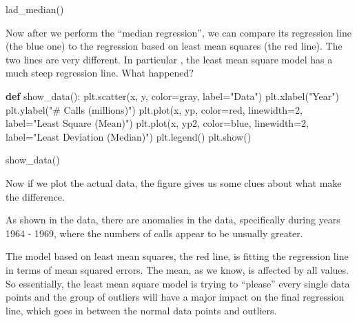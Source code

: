 \documentclass[
  letterpaper,
]{scrbook}
\newenvironment{Shaded}{\begin{snugshade}}{\end{snugshade}}
\newcommand{\DecValTok}[1]{\textcolor[rgb]{0.68,0.00,0.00}{#1}}
\newcommand{\KeywordTok}[1]{\textcolor[rgb]{0.00,0.23,0.31}{\textbf{#1}}}
\newcommand{\NormalTok}[1]{\textcolor[rgb]{0.00,0.23,0.31}{#1}}
\newcommand{\OperatorTok}[1]{\textcolor[rgb]{0.37,0.37,0.37}{#1}}
\newcommand{\StringTok}[1]{\textcolor[rgb]{0.13,0.47,0.30}{#1}}
\begin{document}
\begin{Shaded}
\begin{Highlighting}[]
\NormalTok{lad\_median()}
\end{Highlighting}
\end{Shaded}

Now after we perform the ``median regression'', we can compare its
regression line (the blue one) to the regression based on least mean
squares (the red line). The two lines are very different. In particular
, the least mean square model has a much steep regression line. What
happened?

\begin{Shaded}
\begin{Highlighting}[]
\KeywordTok{def}\NormalTok{ show\_data():}
\NormalTok{    plt.scatter(x, y,  color}\OperatorTok{=}\StringTok{\textquotesingle{}gray\textquotesingle{}}\NormalTok{, label}\OperatorTok{=}\StringTok{"Data"}\NormalTok{)}
\NormalTok{    plt.xlabel(}\StringTok{"Year"}\NormalTok{)}
\NormalTok{    plt.ylabel(}\StringTok{"\# Calls (millions)"}\NormalTok{)}
\NormalTok{    plt.plot(x, yp, color}\OperatorTok{=}\StringTok{\textquotesingle{}red\textquotesingle{}}\NormalTok{, linewidth}\OperatorTok{=}\DecValTok{2}\NormalTok{, label}\OperatorTok{=}\StringTok{"Least Square (Mean)"}\NormalTok{)}
\NormalTok{    plt.plot(x, yp2, color}\OperatorTok{=}\StringTok{\textquotesingle{}blue\textquotesingle{}}\NormalTok{, linewidth}\OperatorTok{=}\DecValTok{2}\NormalTok{, label}\OperatorTok{=}\StringTok{"Least Deviation (Median)"}\NormalTok{)}
\NormalTok{    plt.legend()}
\NormalTok{    plt.show()}
\end{Highlighting}
\end{Shaded}

\begin{Shaded}
\begin{Highlighting}[]
\NormalTok{show\_data()}
\end{Highlighting}
\end{Shaded}

Now if we plot the actual data, the figure gives us some clues about
what make the difference.

As shown in the data, there are anomalies in the data, specifically
during years 1964 - 1969, where the numbers of calls appear to be
unsually greater.

The model based on least mean squares, the red line, is fitting the
regression line in terms of mean squared errors. The mean, as we know,
is affected by all values. So essentially, the least mean square model
is trying to ``please'' every single data points and the group of
outliers will have a major impact on the final regression line, which
goes in between the normal data points and outliers.
\end{document}
